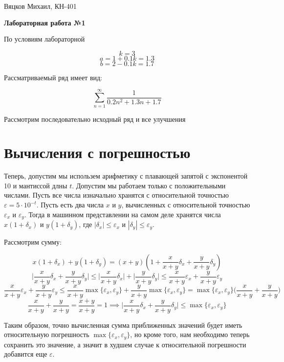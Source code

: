 \documentclass[11pt,a4paper,oneside]{article}
\begin{document}
\begin{center}
	{Вяцков Михаил, КН-401}
	
	{\huge \bf Лабораторная работа №1}
\end{center}

По условиям лабораторной

$$ k = 3 $$
$$ a = 1 + 0.1 k = 1.3 $$
$$ b = 2 - 0.1 k = 1.7 $$

Рассматриваемый ряд имеет вид:

$$ \sum_{n = 1}^{\infty} \frac{1}{0.2n^2 + 1.3n + 1.7} $$

Рассмотрим последовательно исходный ряд и все улучшения

\section{Вычисления с погрешностью}

Теперь, допустим мы использем арифметику с плавающей запятой с экспонентой 10 и мантиссой длны $t$. Допустим мы работаем только с положительными числами. Пусть все числа изначально хранятся с относительной точностью $\varepsilon = 5 \cdot 10^{-t}$. Пусть есть два числа $x$ и $y$, вычисленных с относительной точностью $\varepsilon_x$ и $\varepsilon_y$. Тогда в машинном представлении на самом деле хранятся числа $x (1 + \delta_x)$ и $y (1 + \delta_y)$, где $|\delta_x| \le \varepsilon_x$ и $|\delta_y| \le \varepsilon_y$.

Рассмотрим сумму:

$$ x (1 + \delta_x) + y (1 + \delta_y) = (x + y) (1 + \frac{x}{x + y} \delta_x + \frac{y}{x + y} \delta_y) $$
$$ \biggr|\frac{x}{x + y} \delta_x + \frac{y}{x + y} \delta_y\biggr|
\le \biggr|\frac{x}{x + y} \delta_x\biggr| + \biggr|\frac{y}{x + y} \delta_y\biggr|
\le \frac{x}{x + y} \varepsilon_x + \frac{y}{x + y} \varepsilon_y $$
$$ \frac{x}{x + y} \varepsilon_x + \frac{y}{x + y} \varepsilon_y
\le \frac{x}{x + y} \max \{\varepsilon_x, \varepsilon_y\}
+ \frac{y}{x + y} \max \{\varepsilon_x, \varepsilon_y\}
= \max \{\varepsilon_x, \varepsilon_y\} \biggr(\frac{x}{x + y} + \frac{y}{x + y}\biggr)$$
$$ \frac{x}{x + y} + \frac{y}{x + y} = \frac{x + y}{x + y} = 1
\implies \biggr|\frac{x}{x + y} \delta_x + \frac{y}{x + y} \delta_y\biggr|
\le \max \{\varepsilon_x, \varepsilon_y\} $$

Таким образом, точно вычисленная сумма приближенных значений будет иметь относительную погрешность $\max \{\varepsilon_x, \varepsilon_y\}$, но кроме того, нам необходимо теперь сохранить это значение, а значит в худшем случае к относительной погрешности добавится еще $\varepsilon$.
\end{document}
